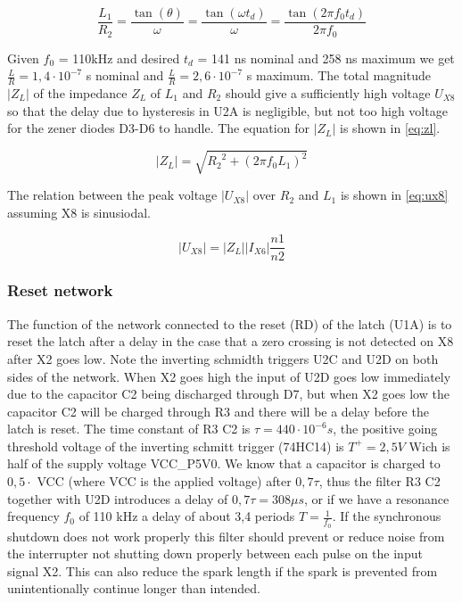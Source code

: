 \begin{equation} \label{eq:lr}
    \frac{L_1}{R_2} = \frac{\tan(\theta)}{\omega} = \frac{\tan(\omega t_{d})}{\omega} = \frac{\tan(2 \pi f_0 t_{d})}{2 \pi f_0}
\end{equation}

Given $f_0$ = 110kHz and desired $t_d$ = 141 ns nominal and 258 ns maximum we get $\frac{L}{R} = 1,4 \cdot 10^{-7}$ s nominal and $\frac{L}{R} = 2,6 \cdot 10^{-7}$ s maximum. The total magnitude $|Z_L|$ of the impedance $Z_{L}$ of $L_1$ and $R_2$ should give a sufficiently high voltage $U_{X8}$ so that the delay due to hysteresis in U2A is negligible, but not too high voltage for the zener diodes D3-D6 to handle. The equation for $|Z_L|$ is shown in \cref{eq:zl}.

\begin{equation} \label{eq:zl}
    |Z_{L}| = \sqrt{{R_2}^2 + (2 \pi f_0 L_1)^2}
\end{equation}

The relation between the peak voltage $|U_{X8}|$ over $R_2$ and $L_1$ is shown in \cref{eq:ux8} assuming X8 is sinusiodal.

\begin{equation} \label{eq:ux8}
    |U_{X8}| = |Z_L| |I_{X6}| \frac{n1}{n2}
\end{equation}


\subsubsection{Reset network}
\label{sec:reset_net}
The function of the network connected to the reset (RD) of the latch (U1A) is to reset the latch after a delay in the case that a zero crossing is not detected on X8 after X2 goes low. Note the inverting schmidth triggers U2C and U2D on both sides of the network. When X2 goes high the input of U2D goes low immediately due to the capacitor C2 being discharged through D7, but when X2 goes low the capacitor C2 will be charged through R3 and there will be a delay before the latch is reset. The time constant of R3 C2 is $\tau = 440 \cdot 10^{-6} s$, the positive going threshold voltage of the inverting schmitt trigger (74HC14) is $T^+ = 2,5V$ Wich is half of the supply voltage VCC\_P5V0. We know that a capacitor is charged to $0,5 \cdot$ VCC (where VCC is the applied voltage) after $0,7 \tau$, thus the filter R3 C2 together with U2D introduces a delay of $0,7 \tau = 308\mu s$, or if we have a resonance frequency $f_0$ of 110 kHz a delay of about 3,4 periods $T = \frac{1}{f_0}$. If the synchronous shutdown does not work properly this filter should prevent or reduce noise from the interrupter not shutting down properly between each pulse on the input signal X2. This can also reduce the spark length if the spark is prevented from unintentionally continue longer than intended.

